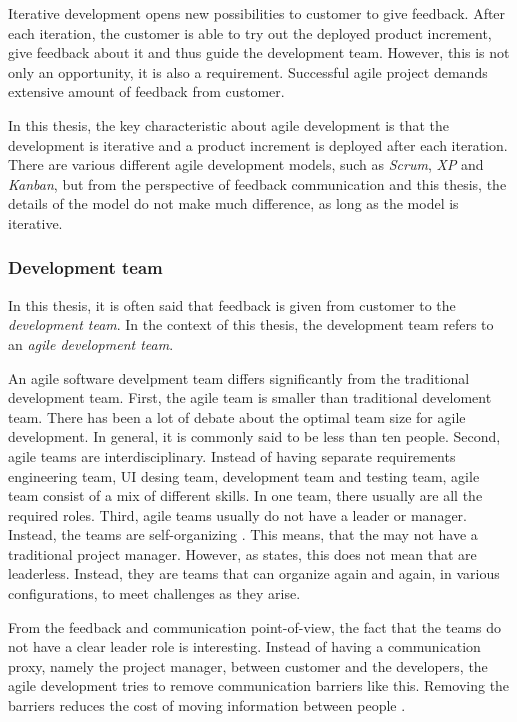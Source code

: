 \documentclass[english,12pt,a4paper,pdftex]{article}
\begin{document}
Iterative development opens new possibilities to customer to give feedback. After each iteration, the customer is able to try out the deployed product increment, give feedback about it and thus guide the development team. However, this is not only an opportunity, it is also a requirement. Successful agile project demands extensive amount of feedback from customer.

In this thesis, the key characteristic about agile development is that the development is iterative and a product increment is deployed after each iteration. There are various different agile development models, such as \emph{Scrum}, \emph{\acl{XP}} and \emph{Kanban}, but from the perspective of feedback communication and this thesis, the details of the model do not make much difference, as long as the model is iterative.

\subsubsection{Development team}

In this thesis, it is often said that feedback is given from customer to the \emph{development team}. In the context of this thesis, the development team refers to an \emph{agile development team}. 

An agile software develpment team differs significantly from the traditional development team. First, the agile team is smaller than traditional develoment team. There has been a lot of debate about the optimal team size for agile development. In general, it is commonly said to be less than ten people. Second, agile teams are interdisciplinary. Instead of having separate requirements engineering team, \ac{UI} desing team, development team and testing team, agile team consist of a mix of different skills. In one team, there usually are all the required roles. Third, agile teams usually do not have a leader or manager. Instead, the teams are self-organizing \citep{cockburn2001}. This means, that the may not have a traditional project manager. However, as \citet{cockburn2001} states, this does not mean that are leaderless. Instead, they are teams that can organize again and again, in various conﬁgurations, to meet challenges as they arise.

From the feedback and communication point-of-view, the fact that the teams do not have a clear leader role is interesting. Instead of having a communication proxy, namely the project manager, between customer and the developers, the agile development tries to remove communication barriers like this. Removing the barriers reduces the cost of moving information between people \citep{cockburn2001}.
\end{document}
